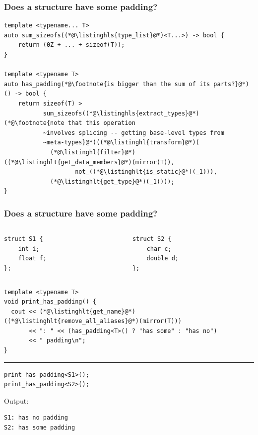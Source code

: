 \documentclass[aspectratio=169,compress,table,xcolor=table]{beamer}
\begin{document}
\begin{frame}[fragile]
  \frametitle{Does a structure have some padding?}
  \begin{lstlisting}[language=c++2x,basicstyle=\footnotesize\ttfamily]
template <typename... T>
auto sum_sizeofs((*@\listinghls{type_list}@*)<T...>) -> bool {
    return (0Z + ... + sizeof(T));
}

template <typename T>
auto has_padding(*@\footnote{is bigger than the sum of its parts?}@*)() -> bool {
    return sizeof(T) >
           sum_sizeofs((*@\listinghls{extract_types}@*)(*@\footnote{note that this operation
           ~involves splicing -- getting base-level types from
           ~meta-types}@*)((*@\listinghl{transform}@*)(
             (*@\listinghl{filter}@*)((*@\listinghlt{get_data_members}@*)(mirror(T)),
                    not_((*@\listinghlt{is_static}@*)(_1))),
             (*@\listinghlt{get_type}@*)(_1))));
}
  \end{lstlisting}
\end{frame}
\begin{frame}[fragile]
  \frametitle{Does a structure have some padding?}
  \begin{columns}
    \begin{column}{.50\textwidth}
      \begin{lstlisting}[language=c++2x,basicstyle=\footnotesize\ttfamily]
struct S1 {
    int i;
    float f;
};
      \end{lstlisting}
    \end{column}
    \begin{column}{.40\textwidth}
      \begin{lstlisting}[language=c++2x,basicstyle=\footnotesize\ttfamily]
struct S2 {
    char c;
    double d;
};
      \end{lstlisting}
    \end{column}
  \end{columns}
  \begin{lstlisting}[language=c++2x,basicstyle=\scriptsize\ttfamily]
template <typename T>
void print_has_padding() {
  cout << (*@\listinghlt{get_name}@*)((*@\listinghlt{remove_all_aliases}@*)(mirror(T)))
       << ": " << (has_padding<T>() ? "has some" : "has no")
       << " padding\n";
}
  \end{lstlisting}
  \hrule
  \begin{lstlisting}[language=c++2x,basicstyle=\scriptsize\ttfamily]
print_has_padding<S1>();
print_has_padding<S2>();
  \end{lstlisting}
  Output:
  \smaller
  \begin{verbatim}
S1: has no padding
S2: has some padding
  \end{verbatim}
\end{frame}
\end{document}
